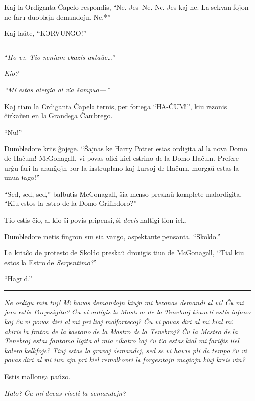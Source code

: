 Kaj la Ordiganta Ĉapelo respondis, ``Ne. Jes. Ne. Ne. Jes kaj ne. La
sekvan fojon ne faru duoblajn demandojn. Ne.*''

Kaj laŭte, ``KORVUNGO!''

\begin{center}\rule{3in}{0.4pt}\end{center}

``\emph{Ho ve. Tio neniam okazis antaŭe\ldots}''

\emph{Kio?}

\emph{``Mi estas alergia al via ŝampuo—''}

Kaj tiam la Ordiganta Ĉapelo ternis, per fortega ``HA-ĈUM!'', kiu
rezonis ĉirkaŭen en la Grandega Ĉambrego.

``Nu!''

Dumbledore kriis ĝojege. ``Ŝajnas ke Harry Potter estas ordigita al la
nova Domo de Haĉum! McGonagall, vi povas ofici kiel estrino de la Domo
Haĉum. Prefere urĝu fari la aranĝojn por la instruplano kaj kursoj de
Haĉum, morgaŭ estas la unua tago!''

``Sed, sed, sed,'' balbutis McGonagall, ŝia menso preskaŭ komplete
malordigita, ``Kiu estos la estro de la Domo Grifindoro?''

Tio estis ĉio, al kio ŝi povis pripensi, ŝi \emph{devis} haltigi tion
iel\ldots

Dumbledore metis fingron sur sia vango, aspektante
pensanta. ``Skoldo.''

La kriaĉo de protesto de Skoldo preskaŭ dronigis tiun de McGonagall,
``Tial kiu estos la Estro de \emph{Serpentimo?}''

``Hagrid.''

\begin{center}\rule{3in}{0.4pt}\end{center}

\emph{Ne ordigu min tuj! Mi havas
  demandojn kiujn mi bezonas demandi al vi! Ĉu mi jam estis
  Forgesigita?  Ĉu vi ordigis la Mastron de la Tenebroj kiam li estis
  infano kaj ĉu vi povas diri al mi pri liaj malfortecoj? Ĉu vi povas
  diri al mi kial mi akiris la fraton de la bastono de la Mastro de la
  Tenebroj?  Ĉu la Mastro de la Tenebroj estas fantomo ligita al mia
  cikatro kaj ĉu tio estas kial mi fariĝis tiel kolera kelkfoje? Tiuj
  estas la gravaj demandoj, sed se vi havas pli da tempo ĉu vi povas
  diri al mi iun ajn pri kiel remalkovri la forgesitajn magiojn kiuj
  kreis vin?}

Estis mallonga paŭzo.

\emph{Halo?  Ĉu mi devas ripeti la demandojn?}

